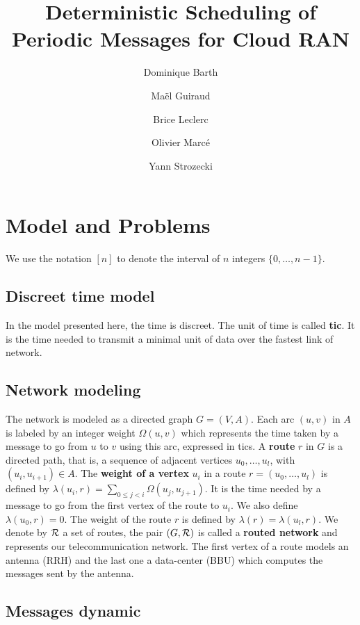 \documentclass[10pt]{article}
\title{Deterministic Scheduling of Periodic Messages for Cloud RAN}
\author[1]{Dominique Barth}
\author[1,2]{Ma\"el Guiraud}
\author[2]{Brice Leclerc}
\author[2]{Olivier Marc\'e}
\author[1]{Yann Strozecki}
\affil[1]{David Laboratory, UVSQ}
\affil[2]{Nokia Bell Labs France}
\newcommand{\todo}[1]{{\color{red} TODO: {#1}}}
\begin{document}
\maketitle\section{Model and Problems}\label{sec:def}

We use the notation $[n]$ to denote the interval of $n$ integers $\{0,\dots,n-1\}$.

  \subsection{Discreet time model}
  In the model presented here, the time is discreet. The unit of time is called  {\bf tic}. It is the time needed to transmit a minimal unit of data over the fastest link of network.
  \subsection{Network modeling}
  
The network is modeled as a directed graph $G=(V,A)$. Each arc  $(u,v)$ in $A$ is labeled by an integer weight $\Omega(u,v)$ which represents the time taken by a message to go from $u$ to $v$ using this arc, expressed in tics. A {\bf route} $r$ in $G$ is a directed path, that is, a sequence of adjacent vertices $u_0, \ldots , u_{l}$, with $(u_i,u_{i+1}) \in A$.  The {\bf weight of a vertex} $u_i$ in a route $r=(u_0,\dots,u_l)$ is defined by $\lambda(u_i,r)= \sum\limits_{0 \leq j <i} \Omega(u_j, u_{j+1})$. It is the time needed by a message to go from the first vertex of the route to $u_i$. We also define $\lambda(u_0,r)=0$. The weight of the route $r$ is defined by $\lambda (r)= \lambda (u_l,r)$.
We denote by $\cal R$ a set of routes, the pair $(G,\cal R)$ is called a {\bf routed network} and represents our telecommunication network.
The first vertex of a route models an antenna (RRH) and the last one a data-center (BBU) which computes the messages sent by the antenna.

   \subsection{Messages dynamic}
	 
    
\end{document}
